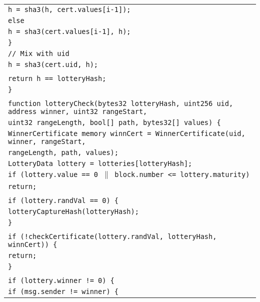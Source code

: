 \documentclass[a4paper]{article}
\begin{document}
\begin{tabularx}{\linewidth}{l}
        \qquad\qquad\qquad\qquad\texttt{h = sha3(h, cert.values[i-1]);}\\
        \qquad\qquad\qquad\texttt{else}\\
        \qquad\qquad\qquad\qquad\texttt{h = sha3(cert.values[i-1], h);}\\
        \qquad\qquad\qquad\texttt{\}}\\
        \qquad\qquad\texttt{// Mix with~uid}\\
        \qquad\qquad\texttt{h = sha3(cert.uid, h);}\\
        \\
        \qquad\qquad\texttt{return h == lotteryHash;}\\
        \qquad\texttt{\}}\\
        \\
        \qquad\texttt{function lotteryCheck(bytes32 lotteryHash, uint256 uid, address winner, uint32 rangeStart,}\\
        \qquad\qquad\qquad\qquad\texttt{uint32 rangeLength, bool[] path, bytes32[] values) \{}\\
        \qquad\qquad\texttt{WinnerCertificate memory winnCert = WinnerCertificate(uid, winner, rangeStart,}\\
        \qquad\qquad\qquad\qquad\qquad\qquad\qquad\texttt{rangeLength, path, values);}\\
        \qquad\qquad\texttt{LotteryData lottery = lotteries[lotteryHash];}\\
        \qquad\qquad\texttt{if (lottery.value == 0 $\|$ block.number <= lottery.maturity)}\\
        \qquad\qquad\qquad\texttt{return;}\\
        \\
        \qquad\qquad\texttt{if (lottery.randVal == 0) \{}\\
        \qquad\qquad\qquad\texttt{lotteryCaptureHash(lotteryHash);}\\
        \qquad\qquad\texttt{\}}\\
        \\
        \qquad\qquad\texttt{if (!checkCertificate(lottery.randVal, lotteryHash, winnCert)) \{}\\
        \qquad\qquad\qquad\texttt{return;}\\
        \qquad\qquad\texttt{\}}\\
        \\
        \qquad\qquad\texttt{if (lottery.winner != 0) \{}\\
        \qquad\qquad\qquad\texttt{if (msg.sender != winner) \{}\\

\end{tabularx}
\end{document}
